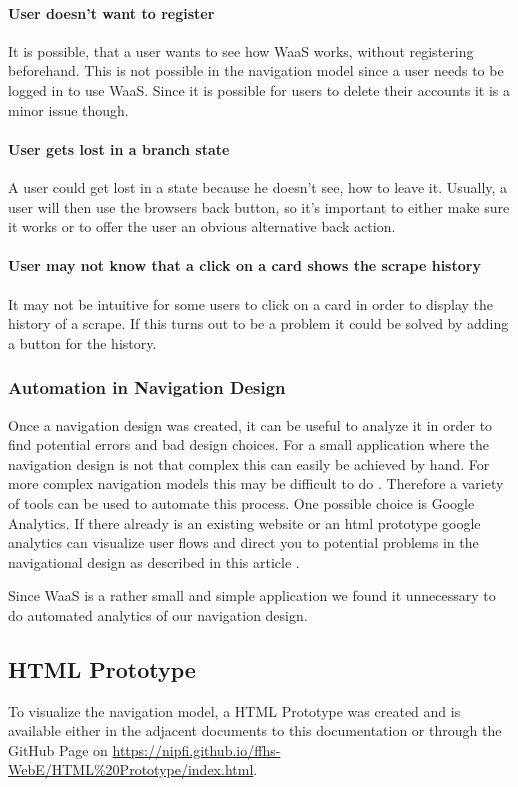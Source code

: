 \documentclass[titlepage, 12pt]{article}
\begin{document}
\paragraph{User doesn't want to register}
It is possible, that a user wants to see how WaaS works, without registering beforehand.
This is not possible in the navigation model since a user needs to be logged in to use WaaS. Since it is possible for users to delete their accounts it is a minor issue though.

\paragraph{User gets lost in a branch state}
A user could get lost in a state because he doesn't see, how to leave it. Usually, a user will then use the browsers back button, so it's important to either make sure it works or to offer the user an obvious alternative back action.

\paragraph{User may not know that a click on a card shows the scrape history}
It may not be intuitive for some users to click on a card in order to display the history of a scrape. If this turns out to be a problem it could be solved by adding a button for the history.

\subsubsection{Automation in Navigation Design}

Once a navigation design was created, it can be useful to analyze it in order to find potential errors and bad design choices. For a small application where the navigation design is not that complex this can easily be achieved by hand. For more complex navigation models this may be difficult to do \cite{mSharonHurleyHall2019}. Therefore a variety of tools can be used to automate this process. One possible choice is Google Analytics. If there already is an existing website or an html prototype google analytics can visualize user flows and direct you to potential problems in the navigational design as described in this article \cite{mAndyCrestodina2018}.

Since WaaS is a rather small and simple application we found it unnecessary to do automated analytics of our navigation design.

\subsection{HTML Prototype}
To visualize the navigation model, a HTML Prototype was created and is available either in the adjacent documents to this documentation or through the GitHub Page on \url{https://nipfi.github.io/ffhs-WebE/HTML%20Prototype/index.html}.
\end{document}
